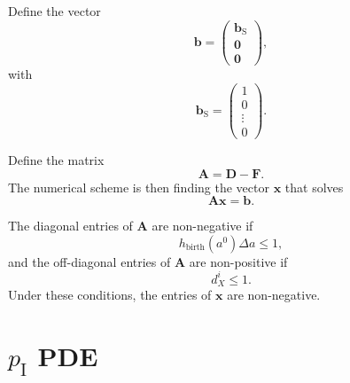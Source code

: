 \documentclass[12pt]{article}
\renewcommand{\vec}[1]{\mathbf{#1}}
\newcommand{\mat}[1]{\mathbf{#1}}
\begin{document}
Define the vector
\begin{equation}
  \vec{b} =
  \begin{pmatrix}
    \vec{b}_{\mathrm{S}} \\
    \vec{0} \\
    \vec{0}
  \end{pmatrix},
\end{equation}
with
\begin{equation}
  \vec{b}_{\mathrm{S}} =
  \begin{pmatrix}
    1 \\
    0 \\
    \vdots \\
    0
  \end{pmatrix}.
\end{equation}

Define the matrix
\begin{equation}
  \mat{A} =
  \mat{D} - \mat{F}.
\end{equation}
The numerical scheme is then finding the vector $\vec{x}$ that solves
\begin{equation}
  \mat{A} \vec{x} = \vec{b}.
\end{equation}

The diagonal entries of $\mat{A}$ are non-negative if
\begin{equation}
  h_{\text{birth}}(a^0) \Delta a \leq 1,
\end{equation}
and the off-diagonal entries of $\mat{A}$ are non-positive if
\begin{equation}
  d_X^i \leq 1.
\end{equation}
Under these conditions, the entries of $\vec{x}$ are non-negative.


\section{$p_\mathrm{I}$ PDE}
\end{document}
